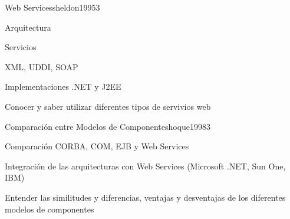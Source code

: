 \begin{syllabus}
\begin{unit}{Web Services}{sheldon1995}{3}
   \begin{topics}
      \item Arquitectura
      \item Servicios
      \item XML, UDDI, SOAP
      \item Implementaciones .NET y J2EE
   \end{topics}

   \begin{unitgoals}
      \item Conocer y saber utilizar diferentes tipos de servivios web
   \end{unitgoals}
\end{unit}

\begin{unit}{Comparación entre Modelos de Componentes}{hoque1998}{3}
   \begin{topics}
      \item Comparación CORBA, COM, EJB y Web Services
      \item Integración de las arquitecturas con Web Services (Microsoft .NET, Sun One, IBM)
   \end{topics}

   \begin{unitgoals}
      \item Entender las similitudes y diferencias, ventajas y desventajas de los diferentes modelos de componentes
   \end{unitgoals}
\end{unit}

\begin{coursebibliography}
\end{coursebibliography}
\end{syllabus}
